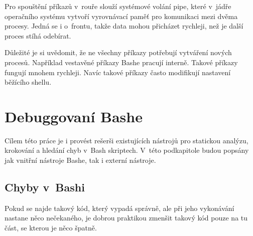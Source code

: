 \documentclass[thesis=M,czech]{FITthesis}[2012/06/26]
\begin{document}
Pro spouštění příkazů v~rouře slouží systémové volání pipe, které v~jádře operačního systému vytvoří vyrovnávací paměť pro komunikaci mezi dvěma procesy. Jedná se i o~frontu, takže data mohou přicházet rychleji, než je další proces stíhá odebírat.

Důležité je si uvědomit, že ne všechny příkazy potřebují vytváření nových procesů. Například vestavěné příkazy Bashe pracují interně. Takové příkazy fungují mnohem rychleji. Navíc takové příkazy často modifikují nastavení běžícího shellu.













%
%
\section{Debuggovaní Bashe} %

Cílem této práce je i provést rešerši existujících nástrojů pro statickou analýzu, krokování a hledání chyb v~Bash skriptech. V~této podkapitole budou popsány jak vnitřní nástroje Bashe, tak i externí nástroje.


%
\subsection{Chyby v~Bashi}

Pokud se najde takový kód, který vypadá správně, ale při jeho vykonávání nastane něco nečekaného, je dobrou praktikou zmenšit takový  kód pouze na tu část, se kterou je něco špatně.
\end{document}
